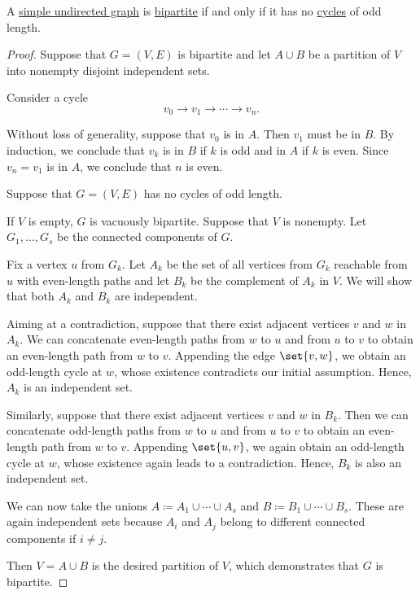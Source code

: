 \begin{proposition}\label{thm:bipartite_iff_no_odd_cycles}
  A \hyperref[def:undirected_graph]{simple undirected graph} is \hyperref[def:n_partite_graph]{bipartite} if and only if it has no \hyperref[def:graph_cycle]{cycles} of odd length.
\end{proposition}
\begin{proof}
  \SufficiencySubProof Suppose that \( G = (V, E) \) is bipartite and let \( A \cup B \) be a partition of \( V \) into nonempty disjoint independent sets.

  Consider a cycle
  \begin{equation*}
    v_0 \to v_1 \to \cdots \to v_n.
  \end{equation*}

  Without loss of generality, suppose that \( v_0 \) is in \( A \). Then \( v_1 \) must be in \( B \). By induction, we conclude that \( v_k \) is in \( B \) if \( k \) is odd and in \( A \) if \( k \) is even. Since \( v_n = v_1 \) is in \( A \), we conclude that \( n \) is even.

  \NecessitySubProof Suppose that \( G = (V, E) \) has no cycles of odd length.

  If \( V \) is empty, \( G \) is vacuously bipartite. Suppose that \( V \) is nonempty. Let \( G_1, \ldots, G_s \) be the connected components of \( G \).

  Fix a vertex \( u \) from \( G_k \). Let \( A_k \) be the set of all vertices from \( G_k \) reachable from \( u \) with even-length paths and let \( B_k \) be the complement of \( A_k \) in \( V \). We will show that both \( A_k \) and \( B_k \) are independent.

  Aiming at a contradiction, suppose that there exist adjacent vertices \( v \) and \( w \) in \( A_k \). We can concatenate even-length paths from \( w \) to \( u \) and from \( u \) to \( v \) to obtain an even-length path from \( w \) to \( v \). Appending the edge \( \set{ v, w } \), we obtain an odd-length cycle at \( w \), whose existence contradicts our initial assumption. Hence, \( A_k \) is an independent set.

  Similarly, suppose that there exist adjacent vertices \( v \) and \( w \) in \( B_k \). Then we can concatenate odd-length paths from \( w \) to \( u \) and from \( u \) to \( v \) to obtain an even-length path from \( w \) to \( v \). Appending \( \set{ u, v } \), we again obtain an odd-length cycle at \( w \), whose existence again leads to a contradiction. Hence, \( B_k \) is also an independent set.

  We can now take the unions \( A \coloneqq A_1 \cup \cdots \cup A_s \) and \( B \coloneqq B_1 \cup \cdots \cup B_s \). These are again independent sets because \( A_i \) and \( A_j \) belong to different connected components if \( i \neq j \).

  Then \( V = A \cup B \) is the desired partition of \( V \), which demonstrates that \( G \) is bipartite.
\end{proof}

